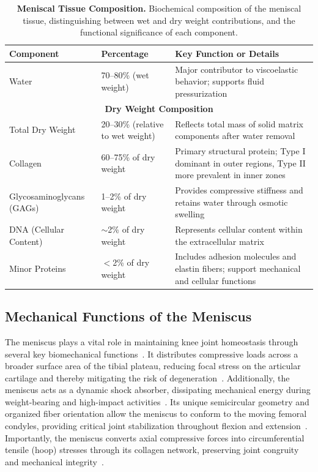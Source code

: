 \begin{table}[H]
    \centering
    \renewcommand{\arraystretch}{1.2}
    \setlength{\tabcolsep}{10pt}
    \begin{tabular}{|p{3.5cm}|p{2cm}|p{7cm}|}
        \hline
        \rowcolor{blue!20}
        \textbf{Component} & \textbf{Percentage} & \textbf{Key Function or Details} \\ \hline
        Water & 70--80\% (wet weight) & Major contributor to viscoelastic behavior; supports fluid pressurization \\ \hline
        \multicolumn{3}{|c|}{\textbf{Dry Weight Composition}} \\ \hline
        Total Dry Weight & 20--30\% (relative to wet weight) & Reflects total mass of solid matrix components after water removal \\ \hline
        Collagen & 60--75\% of dry weight & Primary structural protein; Type I dominant in outer regions, Type II more prevalent in inner zones \\ \hline
        Glycosaminoglycans (GAGs) & 1--2\% of dry weight & Provides compressive stiffness and retains water through osmotic swelling \\ \hline
        DNA (Cellular Content) & $\sim$2\% of dry weight & Represents cellular content within the extracellular matrix \\ \hline
        Minor Proteins & $<$2\% of dry weight & Includes adhesion molecules and elastin fibers; support mechanical and cellular functions \\ \hline
    \end{tabular}
    \caption{\textbf{Meniscal Tissue Composition.} Biochemical composition of the meniscal tissue, distinguishing between wet and dry weight contributions, and the functional significance of each component.}
    \label{tab:meniscus_composition}
\end{table}

\subsection{Mechanical Functions of the Meniscus}

The meniscus plays a vital role in maintaining knee joint homeostasis through several key biomechanical functions~\cite{wang2022advanceselectrospun}.
It distributes compressive loads across a broader surface area of the tibial plateau, reducing focal stress on the articular cartilage and thereby mitigating the risk of degeneration~\cite{boschetti2004biomechanicalproperties}.
Additionally, the meniscus acts as a dynamic shock absorber, dissipating mechanical energy during weight-bearing and high-impact activities~\cite{du2023meniscusheterogeneity}.
Its unique semicircular geometry and organized fiber orientation allow the meniscus to conform to the moving femoral condyles, providing critical joint stabilization throughout flexion and extension~\cite{merriam2015successfultotal}.
Importantly, the meniscus converts axial compressive forces into circumferential tensile (hoop) stresses through its collagen network, preserving joint congruity and mechanical integrity~\cite{bahceciogluanatomicalmeniscus, morejon2020compressiveproperties}.

